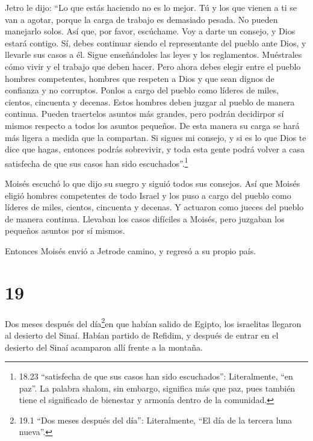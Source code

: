  Jetro le dijo: ``Lo que estás haciendo no es lo mejor.
 Tú y los que vienen a ti se van a agotar, porque la carga
de trabajo es demasiado pesada. No pueden manejarlo solos. 
Así que, por favor, escúchame. Voy a darte un consejo, y Dios estará
contigo. Sí, debes continuar siendo el representante del pueblo ante
Dios, y llevarle sus casos a él.  Sigue enseñándoles las
leyes y los reglamentos. Muéstrales cómo vivir y el trabajo que deben
hacer.  Pero ahora debes elegir entre el pueblo hombres
competentes, hombres que respeten a Dios y que sean dignos de confianza
y no corruptos. Ponlos a cargo del pueblo como líderes de miles,
cientos, cincuenta y decenas.  Estos hombres deben juzgar
al pueblo de manera continua. Pueden traertelos asuntos más grandes,
pero podrán decidirpor sí mismos respecto a todos los asuntos pequeños.
De esta manera su carga se hará más ligera a medida que la compartan.
 Si sigues mi consejo, y si es lo que Dios te dice que
hagas, entonces podrás sobrevivir, y toda esta gente podrá volver a casa
satisfecha de que sus casos han sido escuchados''.\footnote{18.23
  ``satisfecha de que sus casos han sido escuchados'': Literalmente,
  ``en paz''. La palabra shalom, sin embargo, significa más que paz,
  pues también tiene el significado de bienestar y armonía dentro de la
  comunidad.}

 Moisés escuchó lo que dijo su suegro y siguió todos sus
consejos.  Así que Moisés eligió hombres competentes de
todo Israel y los puso a cargo del pueblo como líderes de miles,
cientos, cincuenta y decenas.  Y actuaron como jueces del
pueblo de manera continua. Llevaban los casos difíciles a Moisés, pero
juzgaban los pequeños asuntos por sí mismos.

 Entonces Moisés envió a Jetrode camino, y regresó a su
propio país.

\hypertarget{section-18}{%
\section{19}\label{section-18}}

 Dos meses después del día\footnote{19.1 ``Dos meses después
  del día'': Literalmente, ``El día de la tercera luna nueva''.}en que
habían salido de Egipto, los israelitas llegaron al desierto del Sinaí.
 Habían partido de Refidim, y después de entrar en el
desierto del Sinaí acamparon allí frente a la montaña.

